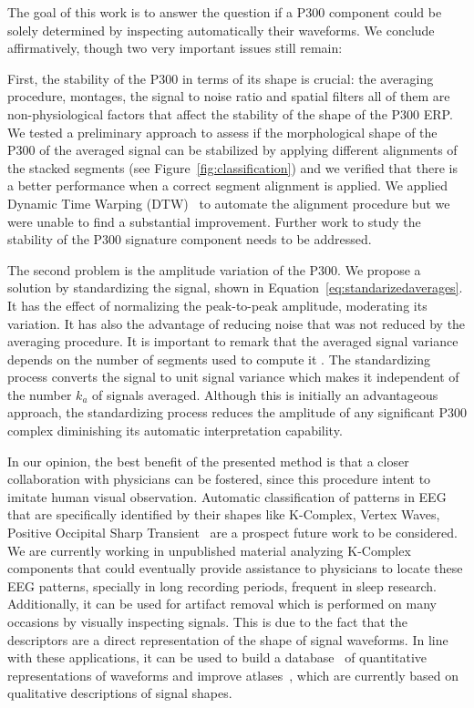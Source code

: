 \documentclass[utf8]{frontiersSCNS} %
\begin{document}

The goal of this work is to answer the question if a P300 component could be solely determined by inspecting automatically their waveforms.  We conclude affirmatively, though two very important issues still remain:

First, the stability of the P300 in terms of its shape is crucial: the averaging procedure, montages, the signal to noise ratio and spatial filters all of them are non-physiological factors that affect the stability of the shape of the P300 ERP.  We tested a preliminary approach to assess if the morphological shape of the P300 of the averaged signal can be stabilized by applying different alignments of the stacked segments (see Figure~\ref{fig:classification}) and we verified that there is a better performance when a correct segment alignment is applied.  We applied Dynamic Time Warping (DTW)~\citep{Casarotto2005} to automate the alignment procedure but we were unable to find a substantial improvement.  Further work to study the stability of the P300 signature component needs to be addressed.

The second problem is the amplitude variation of the P300. We propose a solution by standardizing the signal, shown in Equation~\ref{eq:standarizedaverages}. It has the effect of normalizing the peak-to-peak amplitude, moderating its variation. It has also the advantage of reducing noise that was not reduced by the averaging procedure.   It is important to remark that the averaged signal variance depends on the number of segments used to compute it \citep{van2006signal}.  The standardizing process converts the signal to unit signal variance which makes it independent of the number $k_a$ of signals averaged.   Although this is initially an advantageous approach, the standardizing process reduces the amplitude of any significant P300 complex diminishing its automatic interpretation capability.

In our opinion, the best benefit of the presented method is that a closer collaboration with physicians can be fostered, since this procedure intent to imitate human visual observation.  Automatic classification of patterns in EEG that are specifically identified by their shapes like K-Complex, Vertex Waves, Positive Occipital Sharp Transient~\citep{Hartman2005} are a prospect future work to be considered. We are currently working in unpublished material analyzing K-Complex components that could eventually provide  assistance to physicians to locate these EEG patterns, specially in long recording periods, frequent in sleep research.  
Additionally, it can be used for artifact removal which is performed on many occasions by visually inspecting signals.  This is due to the fact that the descriptors are a direct representation of the shape of signal waveforms. In line with these applications,  it can be used to build a database~\citep{Chavarriaga2017} of quantitative representations of waveforms and improve atlases~\citep{Hartman2005}, which are currently based on qualitative descriptions of signal shapes.
\end{document}
